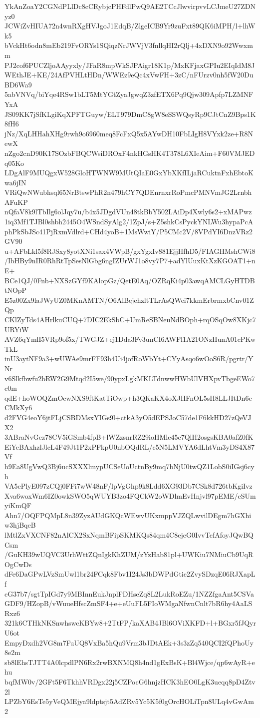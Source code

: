 YkAnZoaY2CGNdPLlDc8cCRybjcPHFdlPwQ9AE2TCcJlwvirpvvLCJmeU27ZDNyz0
JCWiZvHIUA72n4wnRXgHVJgoJ1EdqB/ZlgeICB9Yr9zuFxt89QK6iMPH/l+lhWk5
bVckHt6odn8mEb219FvORYs1SQiqzNrJWVjV3fnllqHI2rQlj+4xDXN9o92Wwxmm
PJ2cof6PUCZljoAAyyxly/JFaR8mpWkSJPAigr18K1p/MxKFjaxGPIu2EIqIdM8J
WEthJE+KE/24AfPVHLtHDn/WWEz9eQc4xVwFH+3zC/nFUrzv0nh5fW20DuBD6Wa9
5abVNVq/biYqe4RSw1bLT5MtYGtZyaJgwqZ3zfETX6Pq9Qjw309Apfp7LZMNFYxA
JS09KK7jSfKLgiKqXPFTGuyw/ELT979DmC8gW8eSSWQsyRp9CJtCnZ9Bps1K8fH6
jNz/XqLHHahXHg9rwh9o6960meq8FcFxQ5x5AYwDH10FbLIgH8VYxk2ze+R8NewX
nZgo2cnD90K17SOzbFBQCWsiDROxF4nkHGsHK4T378L6XIeAim+F60VMJEDq05Ko
LDgAlF9MUQgxW528GloHTWNW9MUtQIaE0GxYbXKfILjaRCuktnFxhEbtoKwa6jIN
VRiQwNWubhsql65NrBtswPhR2n479hCY7QDEnrnxrRoPmcPMNVmJG2LrnbhAFuKP
nQfaV8k9lTbIlg6olJqy7u/b4x5JDgdVUn48tkBbY502LAiDp4Xwly6s2+xMAPwz
1iq3Mf1TJBl0shbh2445O4WSndSyAlg2/1ZpJ/s+Z5shkCsPyckYNLWu3hypaPcA
phPkSbJSc41PjRxmVdlrd+CHd4yoB+1MsWwiY/P5CMc2V/8VPdYI6DnzVRz2GV90
u+AFbLkl5f8RJSxy8yotXNi1sax4VWpB/gxYgxIv881EjjHfhD5/FIAGHMshCWi8
/IbHBy9nIR0RhRtTpSesNlGbg6ngIZUrWJ1o8vy7P7+adYlUuxKtXzKGOAT1+nE+
BCe1QJ/0Fnb+NXSzGYf9KAlopGz/QetE0Aq/OZRqKi4p03awqAMCLGyHTDBtNOpP
E5z00Zx9laJWyUZ0MKnAMTN/O6AlBejehzltTLrAsQWei7kkmErbrmxbCnv01ZQp
CKlZyTds4AHrlkuCUQ+7DIC2EkSbC+UmReSBNeuNdBOph+rqOSqOw8XKjc7URYiW
AVZ6qYmlI5VRp9of5x/TWGJZ+ej1Dda3Fv3unCI6AWFl1A21ONzHunA01cPKwTkL
inU3aytNF9a3+wUWAe9mrFF93h4Ui4jofRoWbYt+CYyAsqo6wOoS6R/pgrtr/YNr
v6Slkfbwfu2bRW2G9Mtqd2I5we/90ypxLgkMKLTdnwwHWbUlVHXpvTbgeEWo7c0m
qdE+hoWOQZmOcwNXS9ftKatTiOwp+h3QKaKX4oXJHFnOL5sH8LLJItDn6eCMkXy6
d2FVG4eoY6jtFLjCSBDMsxYIGs9l+ctkA3yO5dEPSJoC57de1F6kkHD27zQeVJX2
3ABraNvGez78CV5iGSmb4fpB+lWZzsnrRZ29ioHMle45c7QlH2osgsKBA0afZ0fK
EiYeBAxhzlJlcL4F49Jt1P2xPFkpU0nbOQdRL/c5N5LMVYA6dLhtVm3yDS4X87Vf
h9Ea8UgVwQ3Bj6ucSXXXlmypUCSeUoUctnBy9mq7bNjU0twQZ1LobS0iIGsj6cyh
VA5ePlyE097zCQj0FFi7wW48nF/lpVgGhp9k8Ldd6XG93Db7CSk8d726tbKgiIvz
Xva6woxWm6IZ0owkSWO5qWUYB3zo4FQCkW2oWDlmEvHnjvl97pEME/eSUmyiKmQF
Ahn7/OQFPQMpL8n39ZyzAUdGKQcWEwvUKxmppVJZQLwvilDEgm7hGXhiw3hjBqeB
lMtlZxVXCNF82nAlCX2SxNqmBFipSKMKQs84qm4C8ejeG0IvvTcfAfoyJQwBQCsm
/GuKH39wUQVC3UrhWttZQnIgkKhZUM/zYzHab81pl+UWKiu7NMiuCb9UqROgCwDs
dFe6DaGPwLVzSmUwl1br24FCqk8Fbv1I24Js3bDWPdGtic2ZvySDzqE06RJXapLf
cG37b7/sgtTpIGd7y9MBInnEukJnplFDHseZq8L2LukRoEZu/1NZZfgaAnt5CSVa
GDF9/HZopB/vWuueHfscZmSF4+e+eUuFL5FIoWMgaNfwnCnlt7bR6hy4AaLSRxz6
321k6CTHkNKSnwhswcKBYw8+2TtFP/kaXAB4JBl6OViXKFD+l+BGxr5fJQyrU6ot
EmpyDxdh2VG8m7FuUQ8VxBa5hQu9Vrm3bJDtAEk+3s3zZq540QCI2fQPhoUy8e2m
sb8lEhsTJTT4A0lcpdlPN6Rx2rwBXNMQ8h4nd1gExBsK+Bl4Wjce/qp6wAyR+ehu
bqfMW0v/2GFt5F6TkhhVRDgx22j5CZPocG6hnjzHCK3hEO0LgK3ueqq8pD4Ztv2l
LPZbY6EsTe5yVeQMEjya9ldptsjt5AdZRv5Yc5K5f0gOrcHOLiTpn8ULq4vGwAm2
